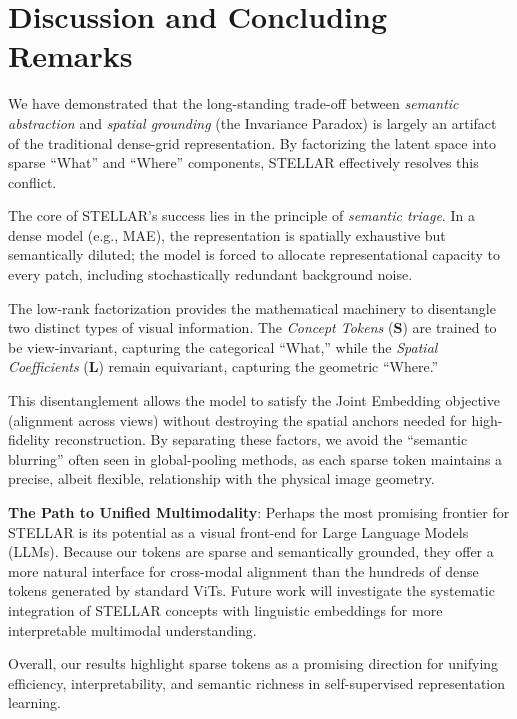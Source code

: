 \section{Discussion and Concluding Remarks}

We have demonstrated that the long-standing trade-off between \textit{semantic abstraction} and \textit{spatial grounding} (the Invariance Paradox) is largely an artifact of the traditional dense-grid representation. By factorizing the latent space into sparse ``What'' and ``Where'' components, STELLAR effectively resolves this conflict.

The core of STELLAR’s success lies in the principle of \textit{semantic triage}. In a dense model (e.g., MAE), the representation is spatially exhaustive but semantically diluted; the model is forced to allocate representational capacity to every patch, including stochastically redundant background noise. 


The low-rank factorization provides the mathematical machinery to disentangle two distinct types of visual information. The \textit{Concept Tokens} ($\mathbf{S}$) are trained to be view-invariant, capturing the categorical ``What,'' while the \textit{Spatial Coefficients} ($\mathbf{L}$) remain equivariant, capturing the geometric ``Where.'' 

This disentanglement allows the model to satisfy the Joint Embedding objective (alignment across views) without destroying the spatial anchors needed for high-fidelity reconstruction. By separating these factors, we avoid the ``semantic blurring'' often seen in global-pooling methods, as each sparse token maintains a precise, albeit flexible, relationship with the physical image geometry.

\textbf{The Path to Unified Multimodality}: Perhaps the most promising frontier for STELLAR is its potential as a visual front-end for Large Language Models (LLMs). Because our tokens are sparse and semantically grounded, they offer a more natural interface for cross-modal alignment than the hundreds of dense tokens generated by standard ViTs. Future work will investigate the systematic integration of STELLAR concepts with linguistic embeddings for more interpretable multimodal understanding.

Overall, our results highlight sparse tokens as a promising direction for unifying efficiency, interpretability, and semantic richness in self-supervised representation learning.


